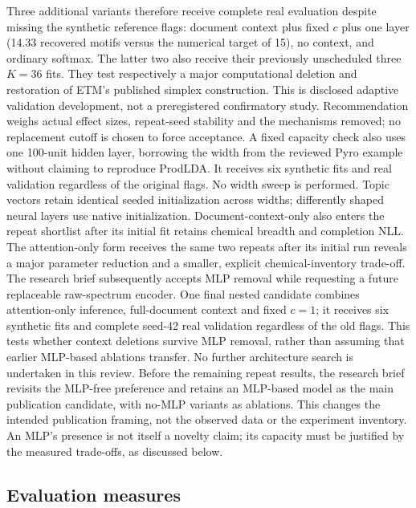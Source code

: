 \documentclass[10pt,a4paper]{article}
\begin{document}
Three additional variants therefore receive complete real evaluation despite
missing the synthetic reference flags: document context plus fixed $c$ plus
one layer (14.33 recovered motifs versus the numerical target of 15), no
context, and ordinary softmax. The latter two also receive their previously
unscheduled three $K=36$ fits. They test respectively a major computational
deletion and restoration of ETM's published simplex construction. This is
disclosed adaptive validation development, not a preregistered confirmatory
study. Recommendation weighs actual effect sizes, repeat-seed stability and
the mechanisms removed; no replacement cutoff is chosen to force acceptance.
A fixed capacity check also uses one 100-unit hidden layer, borrowing the
width from the reviewed Pyro example without claiming to reproduce ProdLDA.
It receives six synthetic fits and real validation regardless of the original
flags. No width sweep is performed. Topic vectors retain identical seeded
initialization across widths; differently shaped neural layers use native
initialization. Document-context-only also enters the repeat shortlist after
its initial fit retains chemical breadth and completion NLL.
The attention-only form receives the same two repeats after its initial run
reveals a major parameter reduction and a smaller, explicit chemical-inventory
trade-off. The research brief subsequently accepts MLP removal while requesting
a future replaceable raw-spectrum encoder. One final nested candidate combines
attention-only inference, full-document context and fixed $c=1$; it receives
six synthetic fits and complete seed-42 real validation regardless of the old
flags. This tests whether context deletions survive MLP removal, rather than
assuming that earlier MLP-based ablations transfer. No further architecture
search is undertaken in this review.
Before the remaining repeat results, the research brief revisits the MLP-free
preference and retains an MLP-based model as the main publication candidate,
with no-MLP variants as ablations. This changes the intended publication
framing, not the observed data or the experiment inventory. An MLP's presence
is not itself a novelty claim; its capacity must be justified by the measured
trade-offs, as discussed below.

\subsection{Evaluation measures}
\end{document}
